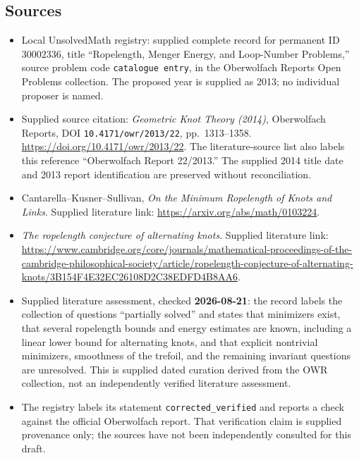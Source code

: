 \documentclass[11pt]{article}
\begin{document}
\subsection{Sources}
\begin{itemize}
\item Local UnsolvedMath registry: supplied complete record for permanent ID \(30002336\), title ``Ropelength, Menger Energy, and Loop-Number Problems,'' source problem code \texttt{catalogue entry}, in the Oberwolfach Reports Open Problems collection. The proposed year is supplied as 2013; no individual proposer is named.
\item Supplied source citation: \emph{Geometric Knot Theory (2014)}, Oberwolfach Reports, DOI \texttt{10.4171/owr/2013/22}, pp.~1313--1358. \url{https://doi.org/10.4171/owr/2013/22}. The literature-source list also labels this reference ``Oberwolfach Report 22/2013.'' The supplied 2014 title date and 2013 report identification are preserved without reconciliation.
\item Cantarella--Kusner--Sullivan, \emph{On the Minimum Ropelength of Knots and Links}. Supplied literature link: \url{https://arxiv.org/abs/math/0103224}.
\item \emph{The ropelength conjecture of alternating knots}. Supplied literature link: \url{https://www.cambridge.org/core/journals/mathematical-proceedings-of-the-cambridge-philosophical-society/article/ropelength-conjecture-of-alternating-knots/3B154F4E32EC26108D2C38EDFD4B8AA6}.
\item Supplied literature assessment, checked \textbf{2026-08-21}: the record labels the collection of questions ``partially solved'' and states that minimizers exist, that several ropelength bounds and energy estimates are known, including a linear lower bound for alternating knots, and that explicit nontrivial minimizers, smoothness of the trefoil, and the remaining invariant questions are unresolved. This is supplied dated curation derived from the OWR collection, not an independently verified literature assessment.
\item The registry labels its statement \texttt{corrected\_verified} and reports a check against the official Oberwolfach report. That verification claim is supplied provenance only; the sources have not been independently consulted for this draft.
\end{itemize}
\end{document}
